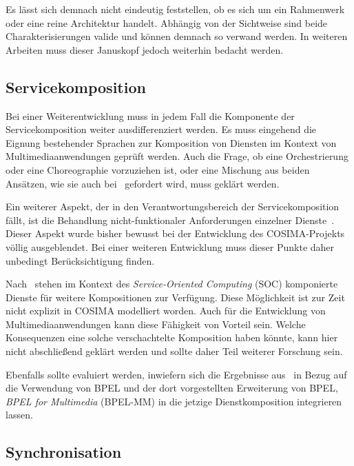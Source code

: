   Es lässt sich demnach nicht eindeutig feststellen, ob es sich um ein Rahmenwerk oder eine reine Architektur handelt. Abhängig von der Sichtweise sind beide Charakterisierungen valide und können demnach so verwand werden. In weiteren Arbeiten muss dieser Januskopf jedoch weiterhin bedacht werden.


\subsection{Servicekomposition} %
\label{sub:servicekomposition_fragen}

  Bei einer Weiterentwicklung muss in jedem Fall die Komponente der Servicekomposition weiter ausdifferenziert werden. Es muss eingehend die Eignung bestehender Sprachen zur Komposition von Diensten im Kontext von Multimediaanwendungen geprüft werden. Auch die Frage, ob eine Orchestrierung oder eine Choreographie vorzuziehen ist, oder eine Mischung aus beiden Ansätzen, wie sie auch bei~\citep{papazoglou2007soc} gefordert wird, muss geklärt werden.
  
  Ein weiterer Aspekt, der in den Verantwortungsbereich der Servicekomposition fällt, ist die Behandlung nicht-funktionaler Anforderungen einzelner Dienste~\citep[S. 42]{papazoglou2007soc}. Dieser Aspekt wurde bisher bewusst bei der Entwicklung des COSIMA-Projekts völlig ausgeblendet. Bei einer weiteren Entwicklung muss dieser Punkte daher unbedingt Berücksichtigung finden.

  Nach~\citep[S. 8]{service_oriented_computing} stehen im Kontext des \emph{Service-Oriented Computing} (SOC) komponierte Dienste für weitere Kompositionen zur Verfügung. Diese Möglichkeit ist zur Zeit nicht explizit in COSIMA modelliert worden. Auch für die Entwicklung von Multimediaanwendungen kann diese Fähigkeit von Vorteil sein. Welche Konsequenzen eine solche verschachtelte Komposition haben könnte, kann hier nicht abschließend geklärt werden und sollte daher Teil weiterer Forschung sein.
  
  Ebenfalls sollte evaluiert werden, inwiefern sich die Ergebnisse aus~\citep{samma08} in Bezug auf die Verwendung von BPEL und der dort vorgestellten Erweiterung von BPEL, \emph{BPEL for Multimedia} (BPEL-MM) in die jetzige Dienstkomposition integrieren lassen.


\subsection{Synchronisation} %
\label{sub:synchronisation}

